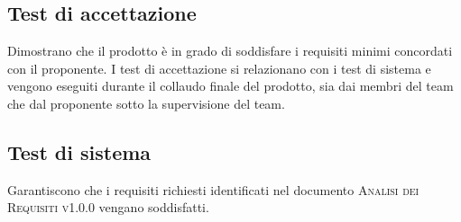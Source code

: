 \documentclass[../piano-di-qualifica.tex]{subfiles}
\begin{document}
\subsection{Test di accettazione}
\label{sub:test_di_accettazione}
Dimostrano che il prodotto è in grado di soddisfare i requisiti minimi concordati con il proponente.
I test di accettazione si relazionano con i test di sistema e vengono eseguiti durante il collaudo finale del prodotto, sia dai membri del team che dal proponente sotto la supervisione del team.

\subsection{Test di sistema}
\label{sub:test_di_sistema}
Garantiscono che i requisiti richiesti identificati nel documento \textsc{Analisi dei Requisiti v1.0.0} vengano soddisfatti.
\end{document}
